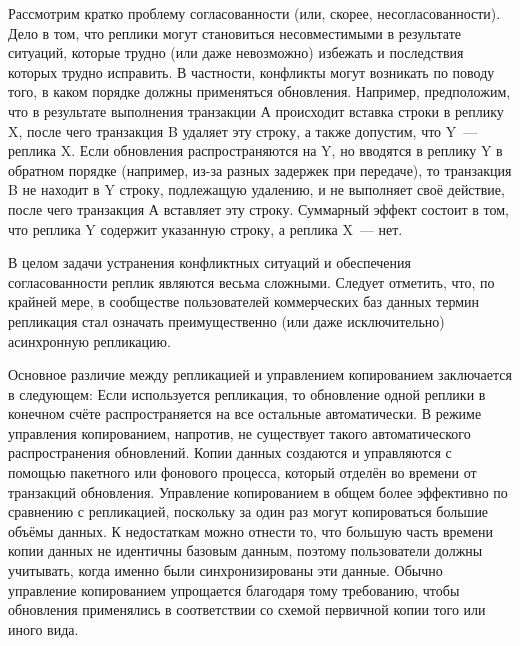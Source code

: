 Рассмотрим кратко проблему согласованности (или, скорее, несогласованности). 
Дело в том, что реплики могут становиться несовместимыми в результате ситуаций, которые трудно (или даже 
невозможно) избежать и последствия которых трудно исправить.
В частности, конфликты могут возникать по поводу того, в каком порядке должны применяться обновления. 
Например, предположим, что в результате выполнения транзакции А происходит вставка строки в реплику X, 
после чего транзакция B удаляет эту строку, а также допустим, что Y~--- реплика X. Если обновления распространяются на Y, 
но вводятся в реплику Y в обратном порядке (например, из-за разных задержек при передаче), то транзакция B не находит в Y 
строку, подлежащую удалению, и не выполняет своё действие, после чего транзакция А вставляет эту строку. Суммарный эффект 
состоит в том, что реплика Y содержит указанную строку, а реплика X~--- нет.

В целом задачи устранения конфликтных ситуаций и обеспечения согласованности реплик являются весьма сложными. 
Следует отметить, что, по крайней мере, в сообществе пользователей коммерческих баз данных термин репликация стал означать 
преимущественно (или даже исключительно) асинхронную репликацию.

Основное различие между репликацией и управлением копированием заключается в следующем:
Если используется репликация, то обновление одной реплики в конечном счёте распространяется на все остальные автоматически.
В режиме управления копированием, напротив, не существует такого автоматического распространения обновлений. 
Копии данных создаются и управляются с помощью пакетного или фонового процесса, который отделён во времени от транзакций обновления.
Управление копированием в общем более эффективно по сравнению с репликацией, поскольку за один раз могут копироваться 
большие объёмы данных. К недостаткам можно отнести то, что большую часть времени копии данных не идентичны базовым данным, 
поэтому пользователи должны учитывать, когда именно были синхронизированы эти данные.
Обычно управление копированием упрощается благодаря тому требованию, чтобы обновления применялись в соответствии со 
схемой первичной копии того или иного вида.


